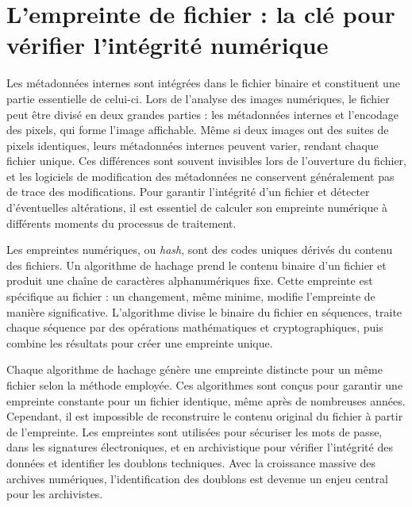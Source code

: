 \section{L'empreinte de fichier : la clé pour vérifier l'intégrité numérique}

Les métadonnées internes sont intégrées dans le fichier binaire et constituent une partie essentielle de celui-ci. Lors de l'analyse des images numériques, le fichier peut être divisé en deux grandes parties : les métadonnées internes et l'encodage des pixels, qui forme l'image affichable. Même si deux images ont des suites de pixels identiques, leurs métadonnées internes peuvent varier, rendant chaque fichier unique. Ces différences sont souvent invisibles lors de l'ouverture du fichier, et les logiciels de modification des métadonnées ne conservent généralement pas de trace des modifications. Pour garantir l'intégrité d'un fichier et détecter d'éventuelles altérations, il est essentiel de calculer son empreinte numérique à différents moments du processus de traitement.

Les empreintes numériques, ou \emph{hash}, sont des codes uniques dérivés du contenu des fichiers. Un algorithme de hachage prend le contenu binaire d'un fichier et produit une chaîne de caractères alphanumériques fixe. Cette empreinte est spécifique au fichier : un changement, même minime, modifie l'empreinte de manière significative. L'algorithme divise le binaire du fichier en séquences, traite chaque séquence par des opérations mathématiques et cryptographiques, puis combine les résultats pour créer une empreinte unique. 

Chaque algorithme de hachage génère une empreinte distincte pour un même fichier selon la méthode employée. Ces algorithmes sont conçus pour garantir une empreinte constante pour un fichier identique, même après de nombreuses années. Cependant, il est impossible de reconstruire le contenu original du fichier à partir de l'empreinte. Les empreintes sont utilisées pour sécuriser les mots de passe, dans les signatures électroniques, et en archivistique pour vérifier l'intégrité des données et identifier les doublons techniques. Avec la croissance massive des archives numériques, l'identification des doublons est devenue un enjeu central pour les archivistes.